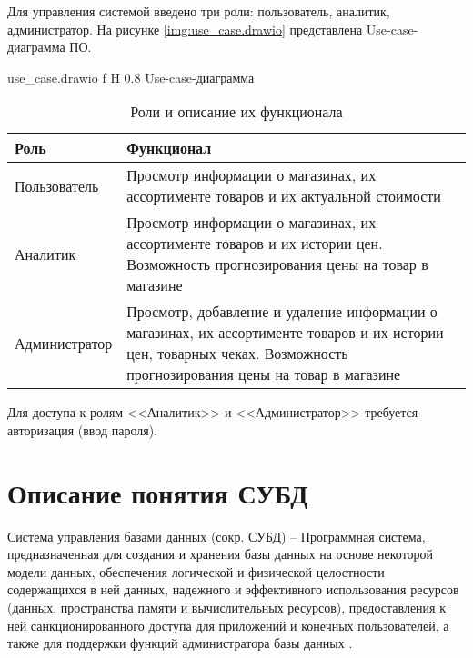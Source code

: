 \documentclass{bmstu}
\begin{document}
Для управления системой введено три роли: пользователь, аналитик, администратор. На рисунке \ref{img:use_case.drawio} представлена Use-case-диаграмма ПО.

	{use_case.drawio}
	{f}
	{H}
	{0.8\textwidth}
	{Use-case-диаграмма}


\begin{table}[H]
	\caption{Роли и описание их функционала}
	\begin{center}
		\begin{tabular}{| l | p{12 cm} |} 
			\hline
			
			\textbf{Роль} & \textbf{Функционал} \\  
			
			\hline
			
			Пользователь & Просмотр информации о магазинах, их ассортименте товаров и их актуальной стоимости \\
			
			\hline
			
			Аналитик & Просмотр информации о магазинах, их ассортименте товаров и их истории цен. Возможность прогнозирования цены на товар в магазине \\
			
			\hline
			
			Администратор & Просмотр, добавление и удаление информации о магазинах, их ассортименте товаров и их истории цен, товарных чеках. Возможность прогнозирования цены на товар в магазине \\
			
			\hline
		\end{tabular}
	\end{center}
\end{table}



Для доступа к ролям <<Аналитик>> и <<Администратор>> требуется авторизация (ввод пароля).

\section{Описание понятия СУБД}

Система управления базами данных (сокр. СУБД) -- Программная система, предназначенная для создания и хранения базы данных на основе некоторой модели данных, обеспечения логической и физической целостности содержащихся в ней данных, надежного и эффективного использования ресурсов (данных, пространства памяти и вычислительных ресурсов), предоставления к ней санкционированного доступа для приложений и конечных пользователей, а также для поддержки 
функций администратора базы данных \cite{kogal}.
\end{document}
